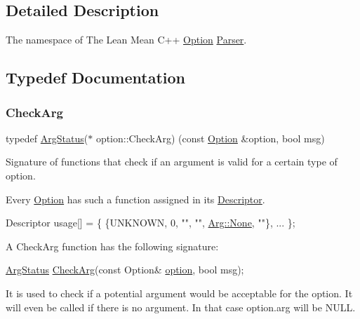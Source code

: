 \subsection{Detailed Description}
The namespace of The Lean Mean C++ \hyperlink{classoption_1_1Option}{Option} \hyperlink{classoption_1_1Parser}{Parser}. 

\subsection{Typedef Documentation}
\mbox{\label{namespaceoption_a4cdf403efae65e18bf850e2001b12a2a}} 
\subsubsection{\texorpdfstring{Check\+Arg}{CheckArg}}
{\footnotesize\ttfamily typedef \hyperlink{namespaceoption_aee8c76a07877335762631491e7a5a1a9}{Arg\+Status}($\ast$ option\+::\+Check\+Arg) (const \hyperlink{classoption_1_1Option}{Option} \&option, bool msg)}



Signature of functions that check if an argument is valid for a certain type of option. 

Every \hyperlink{classoption_1_1Option}{Option} has such a function assigned in its \hyperlink{structoption_1_1Descriptor}{Descriptor}. 
\begin{DoxyCode}
Descriptor usage[] = \{ \{UNKNOWN, 0, \textcolor{stringliteral}{""}, \textcolor{stringliteral}{""}, \hyperlink{structoption_1_1Arg_a7fc01987899c91c6b6a1be5711a46e22}{Arg::None}, \textcolor{stringliteral}{""}\}, ... \};
\end{DoxyCode}


A Check\+Arg function has the following signature\+: 
\begin{DoxyCode}
\hyperlink{namespaceoption_aee8c76a07877335762631491e7a5a1a9}{ArgStatus} \hyperlink{namespaceoption_a4cdf403efae65e18bf850e2001b12a2a}{CheckArg}(\textcolor{keyword}{const} Option& \hyperlink{namespaceoption}{option}, \textcolor{keywordtype}{bool} msg); 
\end{DoxyCode}


It is used to check if a potential argument would be acceptable for the option. It will even be called if there is no argument. In that case {\ttfamily option.\+arg} will be {\ttfamily N\+U\+LL}.

